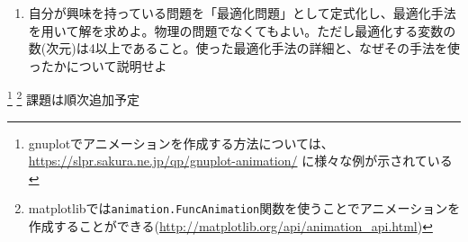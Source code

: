 \documentclass[11pt]{jarticle}
\begin{document}
\begin{enumerate}
\item 自分が興味を持っている問題を「最適化問題」として定式化し、最適化手法を用いて解を求めよ。物理の問題でなくてもよい。ただし最適化する変数の数(次元)は4以上であること。使った最適化手法の詳細と、なぜその手法を使ったかについて説明せよ
  



\end{enumerate}  

\renewcommand{\thefootnote}{\fnsymbol{footnote}}
\footnote[0]{gnuplotでアニメーションを作成する方法については、\url{https://slpr.sakura.ne.jp/qp/gnuplot-animation/} に様々な例が示されている}
\footnote[0]{matplotlibでは\texttt{animation.FuncAnimation}関数を使うことでアニメーションを作成することができる(\url{http://matplotlib.org/api/animation_api.html})}
\noindent
課題は順次追加予定 \\[-0.5em]
\end{document}
